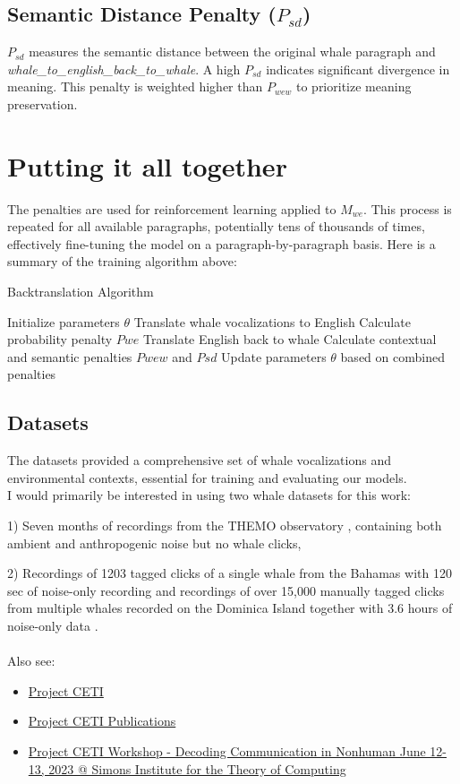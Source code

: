 \documentclass{article}
\begin{document}
\subsection{Semantic Distance Penalty ($P_{sd}$)}
$P_{sd}$ measures the semantic distance between the original whale paragraph and \textit{whale\_to\_english\_back\_to\_whale}. A high $P_{sd}$ indicates significant divergence in meaning. This penalty is weighted higher than $P_{wew}$ to prioritize meaning preservation.

\section{Putting it all together}
The penalties are used for reinforcement learning applied to $M_{we}$. This process is repeated for all available paragraphs, potentially tens of thousands of times, effectively fine-tuning the model on a paragraph-by-paragraph basis.
Here is a summary of the training algorithm above:
\begin{algorithm}
\caption{Backtranslation Algorithm}
\begin{algorithmic}[1]
\STATE Initialize parameters $\theta$
\STATE Translate whale vocalizations to English
\STATE Calculate probability penalty $Pwe$
\STATE Translate English back to whale
\STATE Calculate contextual and semantic penalties $Pwew$ and $Psd$
\STATE Update parameters $\theta$ based on combined penalties
\ENDFOR
\end{algorithmic}
\end{algorithm}
\subsection{Datasets}
The datasets provided a comprehensive set of whale vocalizations and environmental contexts, essential for training and evaluating our models.\\

I would primarily be interested in using two whale datasets for this work: 

1) Seven months of recordings from the THEMO observatory \cite{themo}, containing both ambient and anthropogenic noise but no whale clicks, 

2) Recordings of 1203 tagged clicks of a single whale from the Bahamas with 120 sec of noise-only recording and recordings of over 15,000 manually tagged clicks from multiple whales recorded on the Dominica Island together with 3.6 hours of noise-only data \cite{ceti}. \\ \\
Also see:
\begin{itemize}
    \item \href{https://www.projectceti.org/}{Project CETI}
    \item \href{https://www.projectceti.org/news-research-insights#publications}{Project CETI Publications}
    \item \href{https://www.youtube.com/playlist?list=PL-7Ju3RM0_oUKDIfBWlsOhONsXimWfMlF}{Project CETI Workshop - Decoding Communication in Nonhuman June 12-13, 2023 @ Simons Institute for the Theory of Computing}
\end{itemize}
\end{document}
